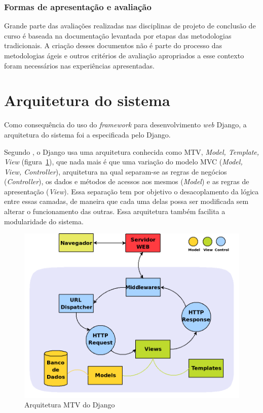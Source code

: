     \subsubsection{Formas de apresentação e avaliação}
      Grande parte das avaliações realizadas nas disciplinas de projeto de conclusão de curso é baseada na documentação levantada por etapas das metodologias tradicionais. A criação desses documentos não é parte do processo das metodologias ágeis e outros critérios de avaliação apropriados a esse contexto foram necessários nas experiências apresentadas.

\section{Arquitetura do sistema}

    Como consequência do uso do \textit{framework} para desenvolvimento \textit{web} Django, a arquitetura do sistema foi a especificada pelo Django.

    Segundo , o Django usa uma arquitetura conhecida como MTV, \textit{Model, Template, View} (figura~\ref{django_arquitetura}), que nada mais é que uma variação do modelo MVC (\textit{Model, View, Controller}), arquitetura na qual separam-se as regras de negócios (\textit{Controller}), os dados e métodos de acessos aos mesmos (\textit{Model}) e as regras de apresentação (\textit{View}). Essa separação tem por objetivo o desacoplamento da lógica entre essas camadas, de maneira que cada uma delas possa ser modificada sem alterar o funcionamento das outras. Essa arquitetura também facilita a modularidade do sistema.

    \begin{figure}[h]
        \begin{center}
    \includegraphics[width=0.7\linewidth]{arquivos/django_arquitetura.png}
        \end{center}
        \caption{Arquitetura MTV do Django}
        \label{django_arquitetura}
    \end{figure}

